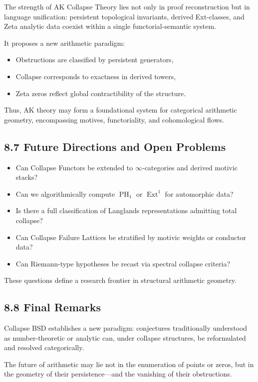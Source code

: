 \documentclass[11pt]{article}
\DeclareMathOperator{\Ext}{Ext}
\DeclareMathOperator{\PH}{PH}
\begin{document}
The strength of AK Collapse Theory lies not only in proof reconstruction but in language unification:  
persistent topological invariants, derived Ext-classes, and Zeta analytic data coexist within a single functorial-semantic system.

It proposes a new arithmetic paradigm:
\begin{itemize}
  \item Obstructions are classified by persistent generators,
  \item Collapse corresponds to exactness in derived towers,
  \item Zeta zeros reflect global contractibility of the structure.
\end{itemize}

Thus, AK theory may form a foundational system for categorical arithmetic geometry, encompassing motives, functoriality, and cohomological flows.

\subsection{8.7 Future Directions and Open Problems}

\begin{itemize}
  \item Can Collapse Functors be extended to $\infty$-categories and derived motivic stacks?
  \item Can we algorithmically compute $\PH_1$ or $\Ext^1$ for automorphic data?
  \item Is there a full classification of Langlands representations admitting total collapse?
  \item Can Collapse Failure Lattices be stratified by motivic weights or conductor data?
  \item Can Riemann-type hypotheses be recast via spectral collapse criteria?
\end{itemize}

These questions define a research frontier in structural arithmetic geometry.

\subsection{8.8 Final Remarks}

Collapse BSD establishes a new paradigm:  
conjectures traditionally understood as number-theoretic or analytic can, under collapse structures, be reformulated and resolved categorically.

The future of arithmetic may lie not in the enumeration of points or zeros, but in the geometry of their persistence—and the vanishing of their obstructions.
\end{document}
